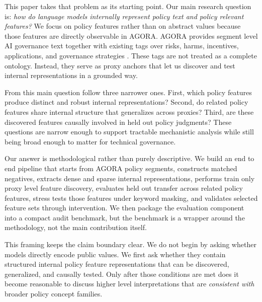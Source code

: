 ﻿\documentclass{article}
\begin{document}
This paper takes that problem as its starting point. Our main research question is: \emph{how do language models internally represent policy text and policy relevant features?} We focus on policy features rather than on abstract values because those features are directly observable in AGORA. AGORA provides segment level AI governance text together with existing tags over risks, harms, incentives, applications, and governance strategies \citep{agora2024}. These tags are not treated as a complete ontology. Instead, they serve as proxy anchors that let us discover and test internal representations in a grounded way.

From this main question follow three narrower ones. First, which policy features produce distinct and robust internal representations? Second, do related policy features share internal structure that generalizes across proxies? Third, are these discovered features causally involved in held out policy judgments? These questions are narrow enough to support tractable mechanistic analysis while still being broad enough to matter for technical governance.

Our answer is methodological rather than purely descriptive. We build an end to end pipeline that starts from AGORA policy segments, constructs matched negatives, extracts dense and sparse internal representations, performs train only proxy level feature discovery, evaluates held out transfer across related policy features, stress tests those features under keyword masking, and validates selected feature sets through intervention. We then package the evaluation component into a compact audit benchmark, but the benchmark is a wrapper around the methodology, not the main contribution itself.

This framing keeps the claim boundary clear. We do not begin by asking whether models directly encode public values. We first ask whether they contain structured internal policy feature representations that can be discovered, generalized, and causally tested. Only after those conditions are met does it become reasonable to discuss higher level interpretations that are \emph{consistent with} broader policy concept families.
\end{document}
